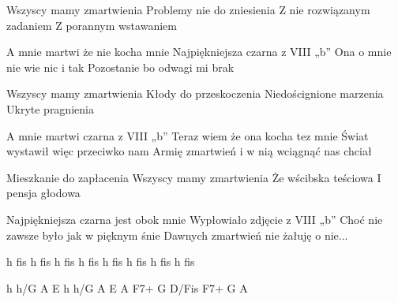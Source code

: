 \begin{text}
Wszyscy mamy zmartwienia
Problemy nie do zniesienia
Z nie rozwiązanym zadaniem
Z porannym wstawaniem

A mnie martwi że nie kocha mnie
Najpiękniejsza czarna z VIII „b”
Ona o mnie nie wie nic i tak
Pozostanie bo odwagi mi brak

Wszyscy mamy zmartwienia
Kłody do przeskoczenia
Niedoścignione marzenia
Ukryte pragnienia

A mnie martwi  czarna z VIII „b”
Teraz wiem że ona kocha tez mnie
Świat wystawił więc przeciwko nam
Armię zmartwień i w nią wciągnąć nas chciał

Mieszkanie do zapłacenia
Wszyscy mamy zmartwienia
Że wścibska teściowa
I pensja głodowa

Najpiękniejsza czarna jest obok mnie
Wypłowiało zdjęcie z VIII „b”
Choć nie zawsze było jak w pięknym śnie
Dawnych zmartwień nie żałuję o nie...
\end{text}
\begin{chord}
h fis h fis 
h fis h fis 
h fis h fis 
h fis h fis 

h h/G A E 
h h/G A E 
A F7+ G D/Fis 
F7+ G A 
\end{chord}